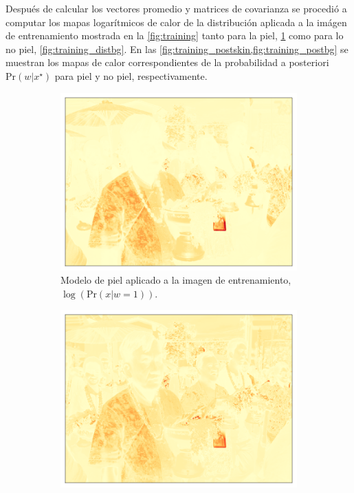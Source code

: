 Después de calcular los vectores promedio y matrices de covarianza se procedió a computar los mapas logarítmicos de calor de la distribución aplicada a la imágen de entrenamiento mostrada en la \cref{fig:training} tanto para la piel, \cref{fig:training_distskin} como para lo no piel, \cref{fig:training_distbg}. En las \cref{fig:training_postskin,fig:training_postbg} se muestran los mapas de calor correspondientes de la probabilidad a posteriori $\text{Pr}(w | x^{\star})$ para piel y no piel, respectivamente.
\begin{figure}[h!]
    \centering
    \begin{subfigure}{0.4\textwidth}
        \centering
        \includegraphics[width=\textwidth]{../figures/image1/image_01_distskin.png}
        \caption{Modelo de piel aplicado a la imagen de entrenamiento, $\log(\text{Pr}(x | w=1))$.}
        \label{fig:training_distskin}
    \end{subfigure}
    \hspace{1cm}
    \begin{subfigure}{0.4\textwidth}
        \centering
        \includegraphics[width=\textwidth]{../figures/image1/image_01_distbg.png}

\end{subfigure}
\end{figure}
